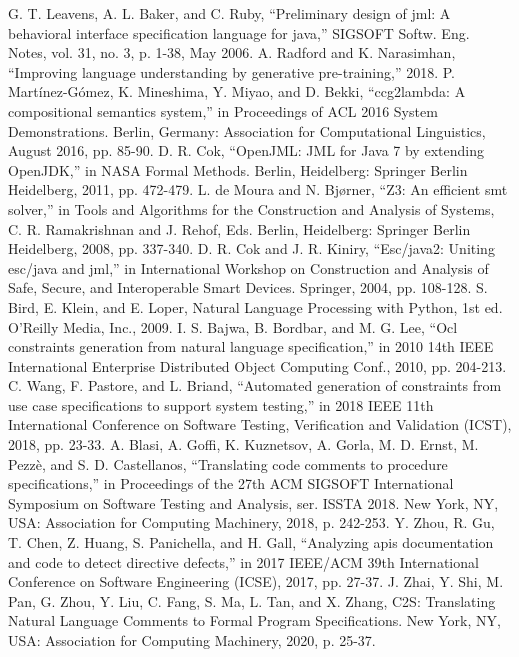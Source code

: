 \documentclass[uplatex, twocolumn, 10pt]{jsarticle} %
\begin{document}
\begin{thebibliography}{99}
     G. T. Leavens, A. L. Baker, and C. Ruby, “Preliminary design of jml: A behavioral interface specification language for java,” SIGSOFT Softw. Eng. Notes, vol. 31, no. 3, p. 1-38, May 2006.
     A. Radford and K. Narasimhan, “Improving language understanding by generative pre-training,” 2018.
     P. Mart\'{i}nez-G\'{o}mez, K. Mineshima, Y. Miyao, and D. Bekki, “ccg2lambda: A compositional semantics system,” in Proceedings of ACL 2016 System Demonstrations. Berlin, Germany: Association for Computational Linguistics, August 2016, pp. 85-90.
     D. R. Cok, “OpenJML: JML for Java 7 by extending OpenJDK,” in NASA Formal Methods. Berlin, Heidelberg: Springer Berlin Heidelberg, 2011, pp. 472-479.
     L. de Moura and N. Bjørner, “Z3: An efficient smt solver,” in Tools and Algorithms for the Construction and Analysis of Systems, C. R. Ramakrishnan and J. Rehof, Eds. Berlin, Heidelberg: Springer Berlin Heidelberg, 2008, pp. 337-340.
     D. R. Cok and J. R. Kiniry, “Esc/java2: Uniting esc/java and jml,” in International Workshop on Construction and Analysis of Safe, Secure, and Interoperable Smart Devices. Springer, 2004, pp. 108-128.
     S. Bird, E. Klein, and E. Loper, Natural Language Processing with Python, 1st ed. O'Reilly Media, Inc., 2009.
     I. S. Bajwa, B. Bordbar, and M. G. Lee, “Ocl constraints generation from natural language specification,” in 2010 14th IEEE International Enterprise Distributed Object Computing Conf., 2010, pp. 204-213.
     C. Wang, F. Pastore, and L. Briand, “Automated generation of constraints from use case specifications to support system testing,” in 2018 IEEE 11th International Conference on Software Testing, Verification and Validation (ICST), 2018, pp. 23-33.
     A. Blasi, A. Goffi, K. Kuznetsov, A. Gorla, M. D. Ernst, M. Pezz\`{e}, and S. D. Castellanos, “Translating code comments to procedure specifications,” in Proceedings of the 27th ACM SIGSOFT International Symposium on Software Testing and Analysis, ser. ISSTA 2018. New York, NY, USA: Association for Computing Machinery, 2018, p. 242-253.
     Y. Zhou, R. Gu, T. Chen, Z. Huang, S. Panichella, and H. Gall, “Analyzing apis documentation and code to detect directive defects,” in 2017 IEEE/ACM 39th International Conference on Software Engineering (ICSE), 2017, pp. 27-37.
     J. Zhai, Y. Shi, M. Pan, G. Zhou, Y. Liu, C. Fang, S. Ma, L. Tan, and X. Zhang, C2S: Translating Natural Language Comments to Formal Program Specifications. New York, NY, USA: Association for Computing Machinery, 2020, p. 25-37.

\end{thebibliography}
\end{document}
